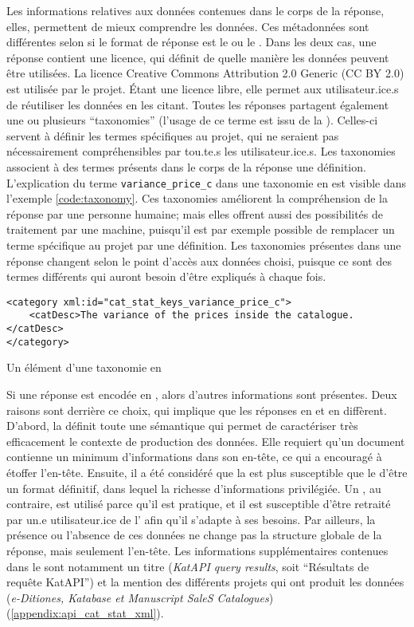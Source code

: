 Les informations relatives aux données contenues dans le corps de la réponse, elles, permettent de mieux comprendre les données. Ces métadonnées sont différentes selon si le format de réponse est le \json{} ou le \tei{}. Dans les deux cas, une réponse contient une licence, qui définit de quelle manière les données peuvent être utilisées. La licence Creative Commons Attribution 2.0 Generic (CC BY 2.0) est utilisée par le projet. Étant une licence libre, elle permet aux utilisateur.ice.s de réutiliser les données en les citant. Toutes les réponses partagent également une ou plusieurs \enquote{taxonomies} (l'usage de ce terme est issu de la \tei{}). Celles-ci servent à définir les termes spécifiques au projet, qui ne seraient pas nécessairement compréhensibles par tou.te.s les utilisateur.ice.s. Les taxonomies associent à des termes présents dans le corps de la réponse une définition. L'explication du terme \texttt{variance\_price\_c} dans une taxonomie en \tei{} est visible dans l'exemple \ref{code:taxonomy}. Ces taxonomies améliorent la compréhension de la réponse par une personne humaine; mais elles offrent aussi des possibilités de traitement par une machine, puisqu'il est par exemple possible de remplacer un terme spécifique au projet par une définition. Les taxonomies présentes dans une réponse changent selon le point d'accès aux données choisi, puisque ce sont des termes différents qui auront besoin d'être expliqués à chaque fois.

\begin{listing}[h]
	\begin{verbatim}
<category xml:id="cat_stat_keys_variance_price_c">
	<catDesc>The variance of the prices inside the catalogue.</catDesc>
</category>
	\end{verbatim}
	\caption{Un élément d'une taxonomie en \tei{}}
	\label{code:taxonomy}
\end{listing}

Si une réponse est encodée en \tei{}, alors d'autres informations sont présentes. Deux raisons sont derrière ce choix, qui implique que les réponses en \json{} et en \tei{} diffèrent. D'abord, la \tei{} définit toute une sémantique qui permet de caractériser très efficacement le contexte de production des données. Elle requiert qu'un document contienne un minimum d'informations dans son en-tête, ce qui a encouragé à étoffer l'en-tête. Ensuite, il a été considéré que la \tei{} est plus susceptible que le \json{} d'être un format définitif, dans lequel la richesse d'informations privilégiée. Un \json{}, au contraire, est utilisé parce qu'il est pratique, et il est susceptible d'être retraité par un.e utilisateur.ice de l'\api{} afin qu'il s'adapte à ses besoins. Par ailleurs, la présence ou l'absence de ces données ne change pas la structure globale de la réponse, mais seulement l'en-tête. Les informations supplémentaires contenues dans le \tei{} sont notamment un titre (\textit{KatAPI query results}, soit \enquote{Résultats de requête KatAPI}) et la mention des différents projets qui ont produit les données (\textit{e-Ditiones, Katabase et Manuscript SaleS Catalogues}) (\ref{appendix:api_cat_stat_xml}).

